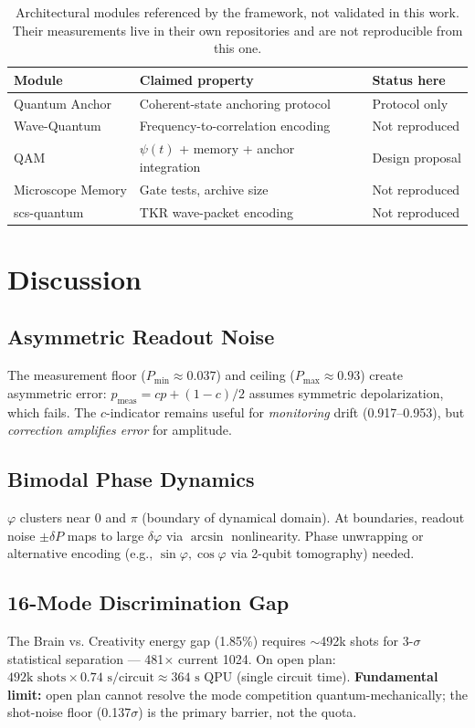 \documentclass[sigconf,anonymous=false]{acmart}
\begin{document}
\begin{table}[h]
\centering
\caption{Architectural modules referenced by the framework, not validated in this work. Their measurements live in their own repositories and are not reproducible from this one.}
\label{tab:notvalidated}
\begin{tabular}{lll}
\toprule
Module & Claimed property & Status here \\
\midrule
Quantum Anchor & Coherent-state anchoring protocol & Protocol only \\
Wave-Quantum & Frequency-to-correlation encoding & Not reproduced \\
QAM & $\psi(t)$ + memory + anchor integration & Design proposal \\
Microscope Memory & Gate tests, archive size & Not reproduced \\
scs-quantum & TKR wave-packet encoding & Not reproduced \\
\bottomrule
\end{tabular}
\end{table}

\section{Discussion}

\subsection{Asymmetric Readout Noise}
The measurement floor ($P_\text{min} \approx 0.037$) and ceiling ($P_\text{max} \approx 0.93$) create asymmetric error: $p_\text{meas} = c p + (1-c)/2$ assumes symmetric depolarization, which fails. The $c$-indicator remains useful for \emph{monitoring} drift (0.917--0.953), but \emph{correction amplifies error} for amplitude.

\subsection{Bimodal Phase Dynamics}
$\varphi$ clusters near $0$ and $\pi$ (boundary of dynamical domain). At boundaries, readout noise $\pm \delta P$ maps to large $\delta\varphi$ via $\arcsin$ nonlinearity. Phase unwrapping or alternative encoding (e.g., $\sin\varphi, \cos\varphi$ via 2-qubit tomography) needed.

\subsection{16-Mode Discrimination Gap}
The Brain vs. Creativity energy gap (1.85\%) requires $\sim$492k shots for 3-$\sigma$ statistical separation --- 481$\times$ current 1024. On open plan: $492\text{k shots} \times 0.74\text{ s/circuit} \approx 364\text{ s QPU}$ (single circuit time). \textbf{Fundamental limit:} open plan cannot resolve the mode competition quantum-mechanically; the shot-noise floor (0.137$\sigma$) is the primary barrier, not the quota.
\end{document}
